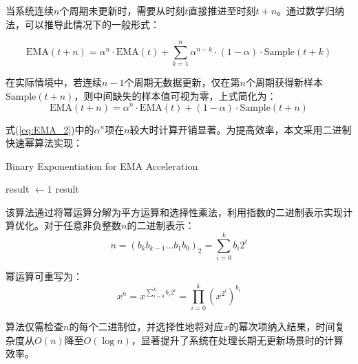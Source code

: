 当系统连续\(n\)个周期未更新时，需要从时刻\(t\)直接推进至时刻\(t+n\)。通过数学归纳法，可以推导此情况下的一般形式：

\begin{equation}
\text{EMA}(t+n) = \alpha^n \cdot \text{EMA}(t) + \sum_{k=1}^{n} \alpha^{n-k} \cdot (1-\alpha) \cdot \text{Sample}(t+k)
\end{equation}

在实际情境中，若连续\(n-1\)个周期无数据更新，仅在第\(n\)个周期获得新样本\(\text{Sample}(t+n)\)，则中间缺失的样本值可视为零，上式简化为：
\begin{equation}
\label{eq:EMA_2}
\text{EMA}(t+n) = \alpha^n \cdot \text{EMA}(t) + (1-\alpha) \cdot \text{Sample}(t+n)
\end{equation}

式(\ref{eq:EMA_2})中的\(\alpha^n\)项在\(n\)较大时计算开销显著。为提高效率，本文采用二进制快速幂算法实现：

\begin{algorithm}[htbp]
    \caption{Binary Exponentiation for EMA Acceleration}
    \label{alg:fast_exp}
    \SetAlgoLined
    
    
    result \(\gets 1\)\;
    \Return result\;
\end{algorithm}

该算法通过将幂运算分解为平方运算和选择性乘法，利用指数的二进制表示实现计算优化。对于任意非负整数\(n\)的二进制表示：
\begin{equation}
n = (b_k b_{k-1} \ldots b_1 b_0)_2 = \sum_{i=0}^{k} b_i 2^i
\end{equation}

幂运算可重写为：
\begin{equation}
x^n = x^{\sum_{i=0}^{k} b_i 2^i} = \prod_{i=0}^k (x^{2^i})^{b_i}
\end{equation}

算法仅需检查\(n\)的每个二进制位，并选择性地将对应\(x\)的幂次项纳入结果，时间复杂度从\(O(n)\)降至\(O(\log n)\)，显著提升了系统在处理长期无更新场景时的计算效率。

